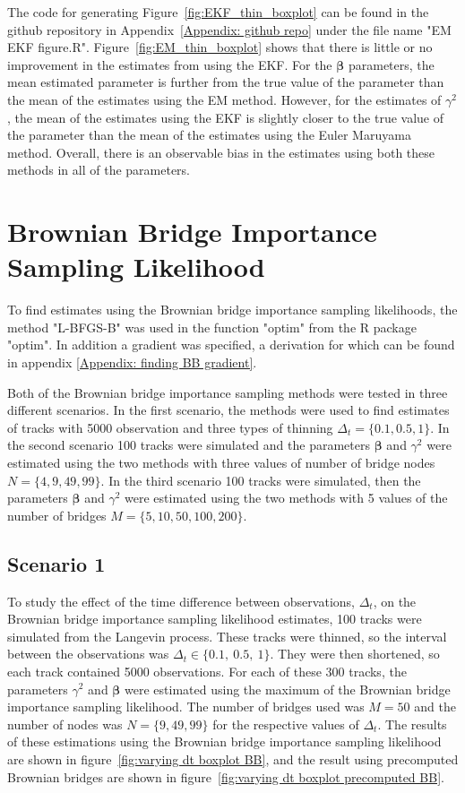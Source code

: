 The code for generating Figure~\ref{fig:EKF_thin_boxplot} can be found in the github repository in Appendix~\ref{Appendix: github repo} under the file name "EM EKF figure.R". Figure~\ref{fig:EM_thin_boxplot} shows that there is little or no improvement in the estimates from using the EKF. For the $\bm \beta$ parameters, the mean estimated parameter is further from the true value of the parameter than the mean of the estimates using the EM method. However, for the estimates of $\gamma^2$, the mean of the estimates using the EKF is slightly closer to the true value of the parameter than the mean of the estimates using the Euler Maruyama method. Overall, there is an observable bias in the estimates using both these methods in all of the parameters.

\section{Brownian Bridge Importance Sampling Likelihood}
\label{sec: BB test}
To find estimates using the Brownian bridge importance sampling likelihoods, the method "L-BFGS-B" was used in the function "optim" from the R package "optim". In addition a gradient was specified, a derivation for which can be found in appendix \ref{Appendix: finding BB gradient}. 


Both of the Brownian bridge importance sampling methods were tested in three different scenarios. In the first scenario, the methods were used to find estimates of tracks with 5000 observation and three types of thinning $\Delta_t =\{0.1, 0.5, 1\}$. In the second scenario 100 tracks were simulated and the parameters $\bm \beta$ and $\gamma^2$ were estimated using the two methods with three values of number of bridge nodes $N=\{4, 9, 49, 99\}$. In the third scenario 100 tracks were simulated, then the parameters $\bm \beta$ and $\gamma^2$ were estimated using the two methods with 5 values of the number of bridges $M=\{5,10,50,100,200\}$. 


\subsection{Scenario 1}
To study the effect of the time difference between observations, $\Delta_t$, on the Brownian bridge importance sampling likelihood estimates, 100 tracks were simulated from the Langevin process. These tracks were thinned, so the interval between the observations was $\Delta_t \in \{0.1, \ 0.5, \ 1\}$. They were then shortened, so each track contained 5000 observations. For each of these 300 tracks, the parameters $\gamma^2$ and $\bm \beta$ were estimated using the maximum of the Brownian bridge importance sampling likelihood. The number of bridges used was $M=50$ and the number of nodes was $N =\{9,49,99\}$ for the respective values of $\Delta_t$. The results of these estimations using the Brownian bridge importance sampling likelihood are shown in figure~\ref{fig:varying dt boxplot BB}, and the result using precomputed Brownian bridges are shown in figure~\ref{fig:varying dt boxplot precomputed BB}.

